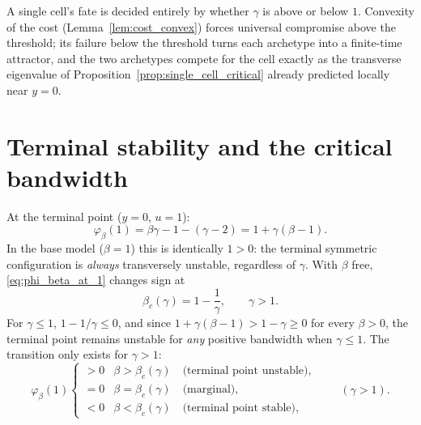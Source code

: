 \documentclass[11pt,a4paper]{article}
\theoremstyle{plain}
\theoremstyle{definition}
\theoremstyle{remark}
\newcommand{\bw}{\beta}
\newcommand{\phib}{\varphi_{\bw}}
\newcommand{\bwc}{\beta_c}
\begin{document}
\begin{keybox}
\begin{center}
\end{center}
A single cell's fate is decided entirely by whether $\gamma$ is above or
below $1$. Convexity of the cost (Lemma~\ref{lem:cost_convex}) forces
universal compromise above the threshold; its failure below the threshold
turns each archetype into a finite-time attractor, and the two archetypes
compete for the cell exactly as the transverse eigenvalue of
Proposition~\ref{prop:single_cell_critical} already predicted locally near
$y=0$.
\end{keybox}

\section{Terminal stability and the critical bandwidth}
\label{sec:critical_bandwidth}

At the terminal point ($y=0$, $u=1$):
\begin{equation}
  \phib(1)=\bw\gamma-1-(\gamma-2)=1+\gamma(\bw-1).
  \label{eq:phi_beta_at_1}
\end{equation}
In the base model ($\bw=1$) this is identically $1>0$: the terminal
symmetric configuration is \emph{always} transversely unstable, regardless
of $\gamma$. With $\bw$ free, \eqref{eq:phi_beta_at_1} changes sign at
\begin{equation}
  \boxed{
  \bwc(\gamma)=1-\frac{1}{\gamma},
  \qquad \gamma>1.
  }
  \label{eq:beta_c}
\end{equation}
For $\gamma\le1$, $1-1/\gamma\le0$, and since $1+\gamma(\bw-1)>1-\gamma\ge0$
for every $\bw>0$, the terminal point remains unstable for \emph{any}
positive bandwidth when $\gamma\le1$. The transition only exists for
$\gamma>1$:
\begin{equation}
  \boxed{
  \phib(1)
  \begin{cases}
  >0 & \bw>\bwc(\gamma) \quad\text{(terminal point unstable)},\\
  =0 & \bw=\bwc(\gamma) \quad\text{(marginal)},\\
  <0 & \bw<\bwc(\gamma) \quad\text{(terminal point stable)},
  \end{cases}
  \qquad(\gamma>1).
  }
  \label{eq:terminal_cases}
\end{equation}
\end{document}
